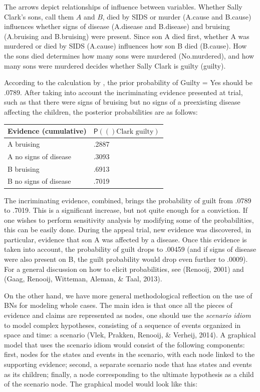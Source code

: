 \documentclass[11pt,dvipsnames,enabledeprecatedfontcommands]{scrartcl}
\newcommand{\pr}[1]{\mathsf{P}(#1)}
\begin{document}
\noindent The arrows depict relationships of influence between
variables. Whether Sally Clark's sons, call them \(A\) and \(B\), died
by SIDS or murder (\textsf{A.cause} and \textsf{B.cause}) influences
whether signs of disease (\textsf{A.disease} and \textsf{B.disease}) and
bruising (\textsf{A.bruising} and \textsf{B.bruising}) were present.
Since son A died first, whether A was murdered or died by SIDS
(\textsf{A.cause}) influences how son B died (\textsf{B.cause}). How the
sons died determines how many sons were murdered (\textsf{No.murdered}),
and how many sons were murdered decides whether Sally Clark is guilty
(\textsf{guilty}).

According to the calculation by \cite{Fenton2018Risk}, the prior
probability of \textrm{Guilty = Yes} should be .0789. After taking into
account the incriminating evidence presented at trial, such as that
there were signs of bruising but no signs of a preexisting disease
affecting the children, the posterior probabilities are as follows:

\begin{center}
\begin{tabular}{@{}ll@{}}
\toprule
Evidence (cumulative) & $\pr(\textrm{Clark guilty})$ 
\\ \midrule 
A bruising& .2887\\
A no signs of disease & .3093\\
B bruising & .6913\\
B no signs of disease  & .7019\\
 \bottomrule
\end{tabular}
\end{center}

\noindent  The incriminating evidence, combined, brings the probability
of guilt from .0789 to .7019. This is a significant increase, but not
quite enough for a conviction. If one wishes to perform sensitivity
analysis by modifying some of the probabilities, this can be easily
done. During the appeal trial, new evidence was discovered, in
particular, evidence that son A was affected by a disease. Once this
evidence is taken into account, the probability of guilt drops to .00459
(and if signs of disease were also present on B, the guilt probability
would drop even further to .0009). For a general discussion on how to
elicit probabilities, see (Renooij, 2001) and (Gaag, Renooij, Witteman,
Aleman, \& Taal, 2013).

On the other hand, we have more general methodological reflection on the
use of BNs for modeling whole cases. The main idea is that once all the
pieces of evidence and claims are represented as nodes, one should use
the \textit{scenario idiom} to model complex hypotheses, consisting of a
sequence of events organized in space and time: a scenario (Vlek,
Prakken, Renooij, \& Verheij, 2014). A graphical model that uses the
scenario idiom would consist of the following components: first, nodes
for the states and events in the scenario, with each node linked to the
supporting evidence; second, a separate scenario node that has states
and events as its children; finally, a node corresponding to the
ultimate hypothesis as a child of the scenario node. The graphical model
would look like this:
\end{document}
